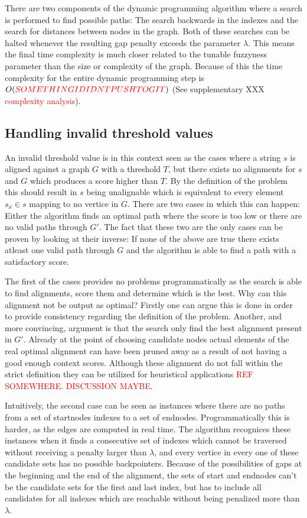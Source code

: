 \documentclass{article}
\begin{document}
\par\noindent
There are two components of the dynamic programming algorithm where a search is performed to find possible paths: The search backwards in the indexes and the search for distances between nodes in the graph. Both of these searches can be halted whenever the resulting gap penalty exceeds the parameter $\lambda$. This means the final time complexity is much closer related to the tunable fuzzyness parameter than the size or complexity of the graph. Because of this the time complexity for the entire dynamic programming step is $O(\textcolor{red}{SOMETHING I DIDNT PUSH TO GIT})$ (See supplementary XXX \textcolor{red}{complexity analysis}).
\subsection{Handling invalid threshold values}
An invalid threshold value is in this context seen as the cases where a string $s$ is aligned against a graph $G$ with a threshold $T$, but there exists no alignments for $s$ and $G$ which produces a score higher than $T$. By the definition of the problem this should result in $s$ being unalignable which is equivalent to every element $s_x \in s$ mapping to no vertice in $G$. There are two cases in which this can happen: Either the algorithm finds an optimal path where the score is too low or there are no valid paths through $G'$. The fact that these two are the only cases can be proven by looking at their inverse: If none of the above are true there exists atleast one valid path through $G$ and the algorithm is able to find a path with a satisfactory score.\\
\par\noindent
The first of the cases provides no problems programmatically as the search is able to find alignments, score them and determine which is the best. Why can this alignment not be output as optimal? Firstly one can argue this is done in order to provide consistency regarding the definition of the problem. Another, and more convincing, argument is that the search only find the best alignment present in $G'$. Already at the point of choosing candidate nodes actual elements of the real optimal alignment can have been pruned away as a result of not having a good enough context scores. Although these alignment do not fall within the strict definition they can be utilized for heuristical applications \textcolor{red}{REF SOMEWHERE. DISCUSSION MAYBE}.\\
\par\noindent
Intuitively, the second case can be seen as instances where there are no paths from a set of startnodes indexes to a set of endnodes. Programmatically this is harder, as the edges are computed in real time. The algorithm recognices these instances when it finds a consecutive set of indexes which cannot be traversed without receiving a penalty larger than $\lambda$, and every vertice in every one of these candidate sets has no possible backpointers. Because of the possibilities of gaps at the beginning and the end of the alignment, the sets of start and endnodes can't be the candidate sets for the first and last index, but has to include all candidates for all indexes which are reachable without being penalized more than $\lambda$.
\end{document}

